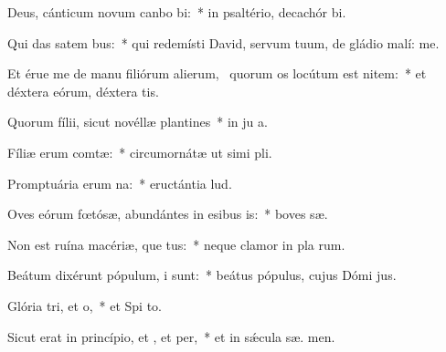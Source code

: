 \item Deus, cánticum novum canbo bi:~* in psaltério, decachór  bi.
\item Qui das satem bus:~* qui redemísti David, servum tuum, de gládio malí:  me.
\item Et érue me de manu filiórum alierum,~\pscross{} quorum os locútum est nitem:~* et déxtera eórum, déxtera tis.
\item Quorum fílii, sicut novéllæ plantines~* in ju a.
\item Fíliæ erum comtæ:~* circumornátæ ut simi pli.
\item Promptuária erum na:~* eructántia    lud.
\item Oves eórum fœtósæ, abundántes in esibus is:~* boves  sæ.
\item Non est ruína macériæ, que tus:~* neque clamor in pla rum.
\item Beátum dixérunt pópulum, i  sunt:~* beátus pópulus, cujus Dómi  jus.
\item Glória tri, et o,~* et Spi to.
\item Sicut erat in princípio, et , et per,~* et in sǽcula sæ. men.
